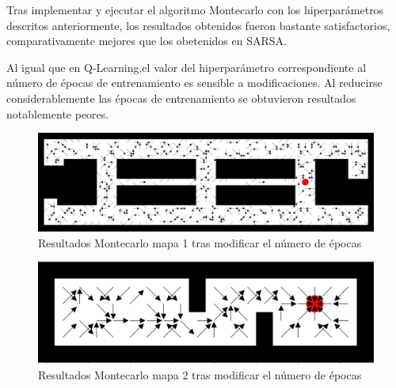 \documentclass[conference,a4paper]{IEEEtran}
\begin{document}
Tras implementar y ejecutar el algoritmo Montecarlo con los hiperparámetros descritos anteriormente, los resultados obtenidos fueron bastante satisfactorios, comparativamente mejores que los obetenidos en SARSA. 

Al igual que en Q-Learning,el valor del hiperparámetro correspondiente al número de épocas de entrenamiento es sensible a modificaciones. Al reducirse considerablemente las épocas de entrenamiento se obtuvieron resultados notablemente peores.\newline

\begin{figure}[h]
  \centering
  \includegraphics[scale=0.18]{report/Montecarlo_epcoas.png}
  \caption{Resultados Montecarlo mapa 1 tras modificar el número de épocas}
  \label{fig:Montecarlo_epocas}
\end{figure}

\begin{figure}[h]
  \centering
  \includegraphics[scale=0.18]{report/Montecarlo2_epocas.png}
  \caption{Resultados Montecarlo mapa 2 tras modificar el número de épocas}
  \label{fig:Montecarlo2_epocas}
\end{figure}
\end{document}
